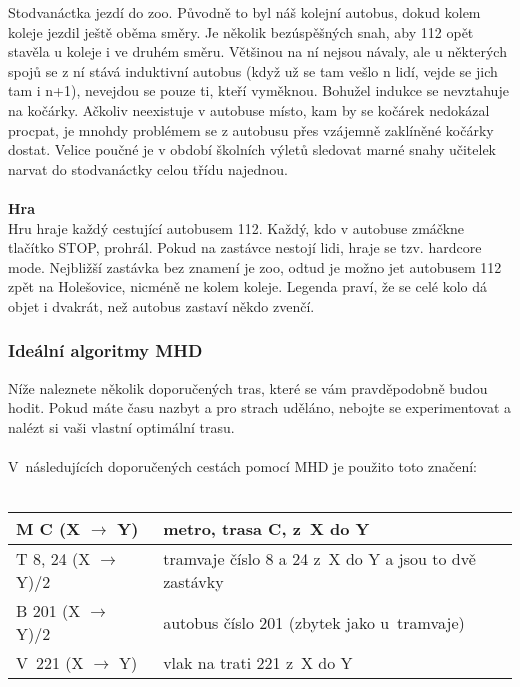 Stodvanáctka jezdí do zoo. Původně to byl náš kolejní autobus, dokud kolem
koleje jezdil ještě oběma směry. Je několik bezúspěšných snah, aby 112 opět
stavěla u koleje i ve druhém směru. Většinou na ní nejsou návaly, ale u
některých spojů se z ní stává induktivní autobus (když už se tam vešlo n lidí,
vejde se jich tam i n+1), nevejdou se pouze ti, kteří vyměknou. Bohužel indukce
se nevztahuje na kočárky. Ačkoliv neexistuje v autobuse místo, kam by se kočárek
nedokázal procpat, je mnohdy problémem se z autobusu přes vzájemně zaklíněné
kočárky dostat. Velice poučné je v období školních výletů sledovat marné snahy
učitelek narvat do stodvanáctky celou třídu najednou.
\\\\
\textbf{Hra}
\\
Hru hraje každý cestující autobusem 112. Každý, kdo v autobuse zmáčkne tlačítko
STOP, prohrál. Pokud na zastávce nestojí lidi, hraje se tzv. hardcore mode.
Nejbližší zastávka bez znamení je zoo, odtud je možno jet autobusem 112 zpět na
Holešovice, nicméně ne kolem koleje. Legenda praví, že se celé kolo dá objet i
dvakrát, než autobus zastaví někdo zvenčí.


\subsubsection{Ideální algoritmy MHD}
Níže naleznete několik doporučených tras, které se vám pravděpodobně budou
hodit. Pokud máte času nazbyt a pro strach uděláno, nebojte se experimentovat a
nalézt si vaši vlastní optimální trasu.
\\\\
V~následujících doporučených cestách pomocí MHD je použito toto
značení:
\\\\
\noindent\begin{tabularx}{\textwidth}{ |l|X| }
\hline
M C (X $\rightarrow$ Y) & metro, trasa C, z~X do Y \\
\hline
T 8, 24 (X $\rightarrow$ Y)/2 & tramvaje číslo 8 a 24 z~X do Y a jsou to dvě
zastávky \\
\hline
B 201 (X $\rightarrow$ Y)/2 & autobus číslo 201 (zbytek jako u~tramvaje)\\
\hline
V~221 (X $\rightarrow$ Y) & vlak na trati 221 z~X do Y \\
\hline
\end{tabularx}
\smallskip

